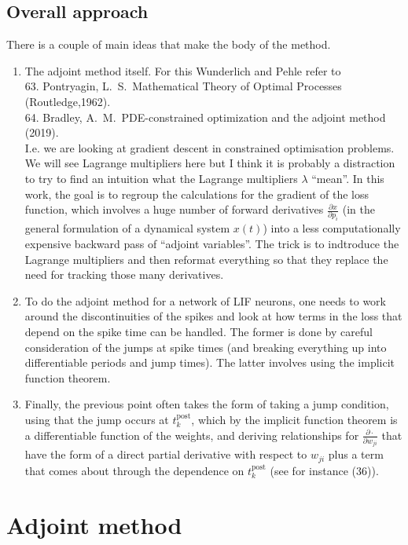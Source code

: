 \documentclass[a4paper]{article}
\newcommand{\blue}[1]{{\color{blue}#1}}
\begin{document}
\subsection{Overall approach}
There is a couple of main ideas that make the body of the method.
\begin{enumerate}
\item The adjoint method itself. For this Wunderlich and Pehle refer
  to \\
  63. Pontryagin, L.~S.~Mathematical Theory of Optimal Processes (Routledge,1962).\\
  64. Bradley, A.~M.~PDE-constrained optimization and the adjoint method (2019).\\
  I.e. we are looking at gradient descent in constrained optimisation
  problems. We will see Lagrange multipliers here but I think it is
  probably a distraction to try to find an intuition what the Lagrange
  multipliers $\lambda$ ``mean''. In this work, the goal is to regroup
  the calculations for the gradient of the loss function, which
  involves a huge number of forward derivatives $\frac{\partial
    x}{\partial p_i}$ (in the general formulation of a dynamical system
  $x(t)$) into a less computationally expensive backward pass of ``adjoint
  variables''. The trick is to indtroduce the Lagrange multipliers and
  then reformat everything so that they replace the need for
  tracking those many derivatives.
\item To do the adjoint method for a network of LIF neurons, one
  needs to work around the discontinuities of the spikes and look at
  how terms in the loss that depend on the spike time can be
  handled. The former is done by careful consideration of the jumps at
  spike times (and breaking everything up into differentiable periods
  and jump times). The latter involves using the implicit function
  theorem.
\item Finally, the previous point often takes the form of taking a jump
  condition, using that the jump occurs at $t^{\text{post}}_k$, which
  by the implicit function theorem is a differentiable function of the
  weights, and deriving relationships for $\frac{\partial
    \cdot}{\partial w_{ji}}$ that have the form of a direct partial
  derivative with respect to $w_{ji}$ plus a term that comes about
  through the dependence on $t^{\text{post}}_k$ (see for instance
  \blue{(36)}).
\end{enumerate}

\section{Adjoint method}
\end{document}
